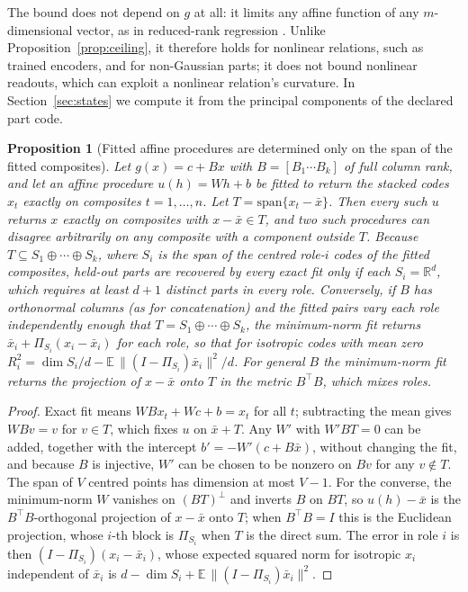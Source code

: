 \documentclass[10pt]{article}
\theoremstyle{plain}
\newtheorem{proposition}{Proposition}
\theoremstyle{remark}
\newcommand{\R}{\mathbb{R}}
\begin{document}
\noindent
The bound does not depend on $g$ at all: it limits any affine function of any $m$-dimensional vector, as in reduced-rank regression \citep{izenman1975}. Unlike Proposition~\ref{prop:ceiling}, it therefore holds for nonlinear relations, such as trained encoders, and for non-Gaussian parts; it does not bound nonlinear readouts, which can exploit a nonlinear relation's curvature. In Section~\ref{sec:states} we compute it from the principal components of the declared part code.

\begin{proposition}[Fitted affine procedures are determined only on the span of the fitted composites]
\label{prop:span}
Let $g(x) = c + Bx$ with $B = [B_1 \cdots B_k]$ of full column rank, and let an affine procedure $u(h) = Wh + b$ be fitted to return the stacked codes $x_t$ exactly on composites $t = 1, \ldots, n$. Let $T = \mathrm{span}\{x_t - \bar{x}\}$. Then every such $u$ returns $x$ exactly on composites with $x - \bar{x} \in T$, and two such procedures can disagree arbitrarily on any composite with a component outside $T$. Because $T \subseteq S_1 \oplus \cdots \oplus S_k$, where $S_i$ is the span of the centred role-$i$ codes of the fitted composites, held-out parts are recovered by every exact fit only if each $S_i = \R^d$, which requires at least $d + 1$ distinct parts in every role. Conversely, if $B$ has orthonormal columns (as for concatenation) and the fitted pairs vary each role independently enough that $T = S_1 \oplus \cdots \oplus S_k$, the minimum-norm fit returns $\bar{x}_i + \Pi_{S_i}(x_i - \bar{x}_i)$ for each role, so that for isotropic codes with mean zero $R^2_i = \dim S_i/d - \mathbb{E}\,\lVert (I - \Pi_{S_i})\bar{x}_i \rVert^2/d$. For general $B$ the minimum-norm fit returns the projection of $x - \bar{x}$ onto $T$ in the metric $B^{\top}B$, which mixes roles.
\end{proposition}

\begin{proof}
Exact fit means $WBx_t + Wc + b = x_t$ for all $t$; subtracting the mean gives $WBv = v$ for $v \in T$, which fixes $u$ on $\bar{x} + T$. Any $W'$ with $W'BT = 0$ can be added, together with the intercept $b' = -W'(c + B\bar{x})$, without changing the fit, and because $B$ is injective, $W'$ can be chosen to be nonzero on $B v$ for any $v \notin T$. The span of $V$ centred points has dimension at most $V - 1$. For the converse, the minimum-norm $W$ vanishes on $(BT)^{\perp}$ and inverts $B$ on $BT$, so $u(h) - \bar{x}$ is the $B^{\top}B$-orthogonal projection of $x - \bar{x}$ onto $T$; when $B^{\top}B = I$ this is the Euclidean projection, whose $i$-th block is $\Pi_{S_i}$ when $T$ is the direct sum. The error in role $i$ is then $(I - \Pi_{S_i})(x_i - \bar{x}_i)$, whose expected squared norm for isotropic $x_i$ independent of $\bar{x}_i$ is $d - \dim S_i + \mathbb{E}\,\lVert (I - \Pi_{S_i})\bar{x}_i \rVert^2$.
\end{proof}
\end{document}
